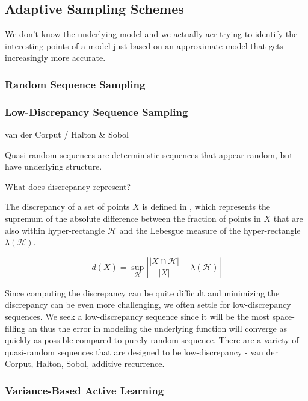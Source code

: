 \documentclass[conference]{IEEEtran}
\begin{document}
    \subsection{Adaptive Sampling Schemes}
	
	We don't know the underlying model and we actually aer trying to identify the interesting points of a model just based on an approximate model that gets increasingly more accurate.

	
	\subsubsection{Random Sequence Sampling}
	
	\subsubsection{Low-Discrepancy Sequence Sampling}
	
	van der Corput / Halton & Sobol
	
	Quasi-random sequences are deterministic sequences that appear random, but have underlying structure. 
	
	What does discrepancy represent? \cite{kuipers1974uniform}
	
	The discrepancy of a set of points $X$ is defined in , which represents the supremum of the absolute difference between the fraction of points in $X$ that are also within hyper-rectangle $\mathcal{H}$ and the Lebesgue measure of the hyper-rectangle $\lambda(\mathcal{H})$.
	
	\begin{equation}
	    \label{eqn:discrepancy}
	    d(X) = \sup_\mathcal{H} \left| \frac{|X \cap \mathcal{H}|}{|X|} - \lambda(\mathcal{H}) \right|
	\end{equation}

	Since computing the discrepancy can be quite difficult and minimizing the discrepancy  can be even more challenging, we often settle for low-discrepancy sequences. We seek a low-discrepancy sequence since it will be the most space-filling an thus the error in modeling the underlying function will converge as quickly as possible compared to purely random sequence. There are a variety of quasi-random sequences that are designed to be low-discrepancy - van der Corput, Halton, Sobol, additive recurrence.

	\subsubsection{Variance-Based Active Learning}
	
\end{document}
